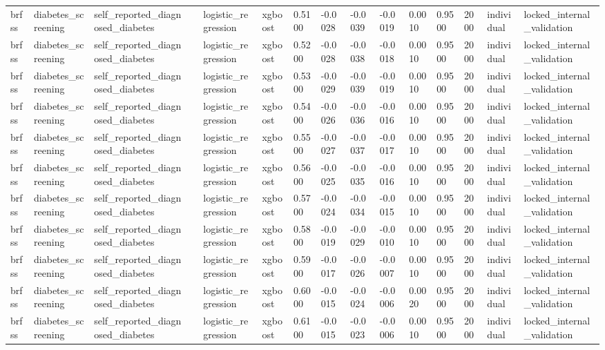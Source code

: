 \begin{tabular}{lllllllllllllll}
brfss & diabetes\_screening & self\_reported\_diagnosed\_diabetes &  & logistic\_regression & xgboost & 0.5100 & -0.0028 & -0.0039 & -0.0019 & 0.0010 & 0.9500 & 2000 & individual & locked\_internal\_validation \\
brfss & diabetes\_screening & self\_reported\_diagnosed\_diabetes &  & logistic\_regression & xgboost & 0.5200 & -0.0028 & -0.0038 & -0.0018 & 0.0010 & 0.9500 & 2000 & individual & locked\_internal\_validation \\
brfss & diabetes\_screening & self\_reported\_diagnosed\_diabetes &  & logistic\_regression & xgboost & 0.5300 & -0.0029 & -0.0039 & -0.0019 & 0.0010 & 0.9500 & 2000 & individual & locked\_internal\_validation \\
brfss & diabetes\_screening & self\_reported\_diagnosed\_diabetes &  & logistic\_regression & xgboost & 0.5400 & -0.0026 & -0.0036 & -0.0016 & 0.0010 & 0.9500 & 2000 & individual & locked\_internal\_validation \\
brfss & diabetes\_screening & self\_reported\_diagnosed\_diabetes &  & logistic\_regression & xgboost & 0.5500 & -0.0027 & -0.0037 & -0.0017 & 0.0010 & 0.9500 & 2000 & individual & locked\_internal\_validation \\
brfss & diabetes\_screening & self\_reported\_diagnosed\_diabetes &  & logistic\_regression & xgboost & 0.5600 & -0.0025 & -0.0035 & -0.0016 & 0.0010 & 0.9500 & 2000 & individual & locked\_internal\_validation \\
brfss & diabetes\_screening & self\_reported\_diagnosed\_diabetes &  & logistic\_regression & xgboost & 0.5700 & -0.0024 & -0.0034 & -0.0015 & 0.0010 & 0.9500 & 2000 & individual & locked\_internal\_validation \\
brfss & diabetes\_screening & self\_reported\_diagnosed\_diabetes &  & logistic\_regression & xgboost & 0.5800 & -0.0019 & -0.0029 & -0.0010 & 0.0010 & 0.9500 & 2000 & individual & locked\_internal\_validation \\
brfss & diabetes\_screening & self\_reported\_diagnosed\_diabetes &  & logistic\_regression & xgboost & 0.5900 & -0.0017 & -0.0026 & -0.0007 & 0.0010 & 0.9500 & 2000 & individual & locked\_internal\_validation \\
brfss & diabetes\_screening & self\_reported\_diagnosed\_diabetes &  & logistic\_regression & xgboost & 0.6000 & -0.0015 & -0.0024 & -0.0006 & 0.0020 & 0.9500 & 2000 & individual & locked\_internal\_validation \\
brfss & diabetes\_screening & self\_reported\_diagnosed\_diabetes &  & logistic\_regression & xgboost & 0.6100 & -0.0015 & -0.0023 & -0.0006 & 0.0010 & 0.9500 & 2000 & individual & locked\_internal\_validation \\

\end{tabular}
